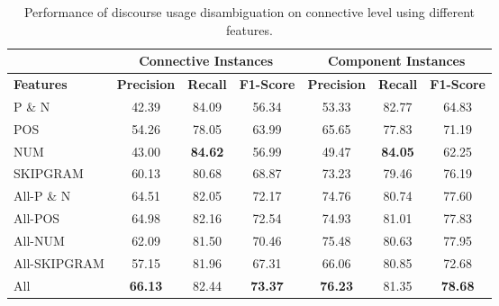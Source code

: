 \begin{table}[ht]
\centering
\begin{tabular}{|l|c|c|c|c|c|c|}
\hline
                    & \multicolumn{3}{|c}{Connective Instances}  & \multicolumn{3}{|c|}{Component Instances} \\ \hline
\bf Features        & \bf Precision & \bf Recall & \bf F1-Score  & \bf Precision & \bf Recall & \bf F1-Score \\ \hline
    P \& N          &     42.39     &     84.09  &     56.34     &     53.33     &     82.77  &     64.83    \\ \hline
    POS             &     54.26     &     78.05  &     63.99     &     65.65     &     77.83  &     71.19    \\ \hline
    NUM             &     43.00     & \bf 84.62  &     56.99     &     49.47     & \bf 84.05  &     62.25    \\ \hline
    SKIPGRAM        &     60.13     &     80.68  &     68.87     &     73.23     &     79.46  &     76.19    \\ \hline
    All-P \& N      &     64.51     &     82.05  &     72.17     &     74.76     &     80.74  &     77.60    \\ \hline
    All-POS         &     64.98     &     82.16  &     72.54     &     74.93     &     81.01  &     77.83    \\ \hline
    All-NUM         &     62.09     &     81.50  &     70.46     &     75.48     &     80.63  &     77.95    \\ \hline
    All-SKIPGRAM    &     57.15     &     81.96  &     67.31     &     66.06     &     80.85  &     72.68    \\ \hline
    All             & \bf 66.13     &     82.44  & \bf 73.37     & \bf 76.23     &     81.35  & \bf 78.68    \\ \hline

\end{tabular}
\caption{\label{t:recognition-connective-features} Performance of discourse usage
disambiguation on connective level using different features. }
\end{table}
